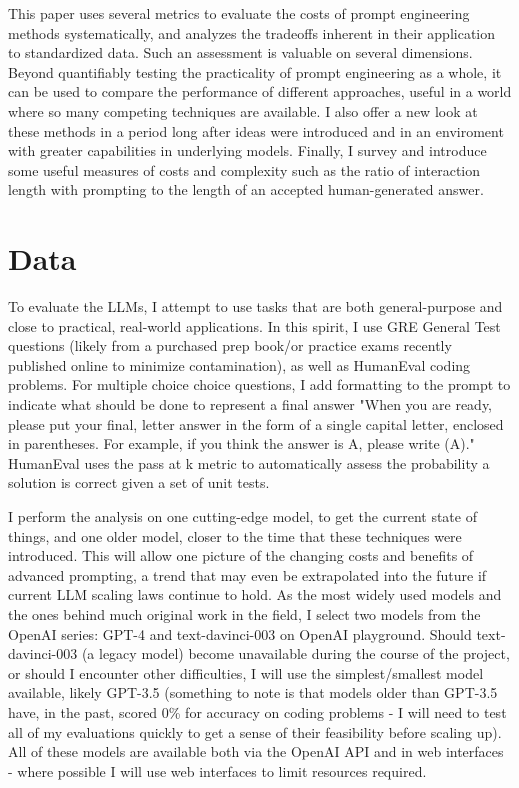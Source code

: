 \documentclass[11pt]{article}
\begin{document}
This paper uses several metrics to evaluate the costs of prompt engineering methods systematically, and analyzes the tradeoffs inherent in their application to standardized data. Such an assessment is valuable on several dimensions. Beyond quantifiably testing the practicality of prompt engineering as a whole, it can be used to compare the performance of different approaches, useful in a world where so many competing techniques are available. I also offer a new look at these methods in a period long after ideas were introduced and in an enviroment with greater capabilities in underlying models. Finally, I survey and introduce some useful measures of costs and complexity such as the ratio of interaction length with prompting to the length of an accepted human-generated answer.

\section*{Data}

To evaluate the LLMs, I attempt to use tasks that are both general-purpose and close to practical, real-world applications. In this spirit, I use GRE General Test questions (likely from a purchased prep book/or practice exams recently published online to minimize contamination), as well as HumanEval coding problems. For multiple choice choice questions, I add formatting to the prompt to indicate what should be done to represent a final answer "When you are ready, please put your final, letter answer in the form of a single capital letter, enclosed in parentheses. For example, if you think the answer is A, please write (A)." HumanEval uses the pass at k metric to automatically assess the probability a solution is correct given a set of unit tests. \cite{chen_evaluating_2021}

I perform the analysis on one cutting-edge model, to get the current state of things, and one older model, closer to the time that these techniques were introduced. This will allow one picture of the changing costs and benefits of advanced prompting, a trend that may even be extrapolated into the future if current LLM scaling laws continue to hold. As the most widely used models and the ones behind much original work in the field, I select two models from the OpenAI series: GPT-4 and text-davinci-003 on OpenAI playground. Should text-davinci-003 (a legacy model) become unavailable during the course of the project, or should I encounter other difficulties, I will use the simplest/smallest model available, likely GPT-3.5 (something to note is that models older than GPT-3.5 have, in the past, scored 0\% for accuracy on coding problems - I will need to test all of my evaluations quickly to get a sense of their feasibility before scaling up). All of these models are available both via the OpenAI API and in web interfaces - where possible I will use web interfaces to limit resources required.
\end{document}
